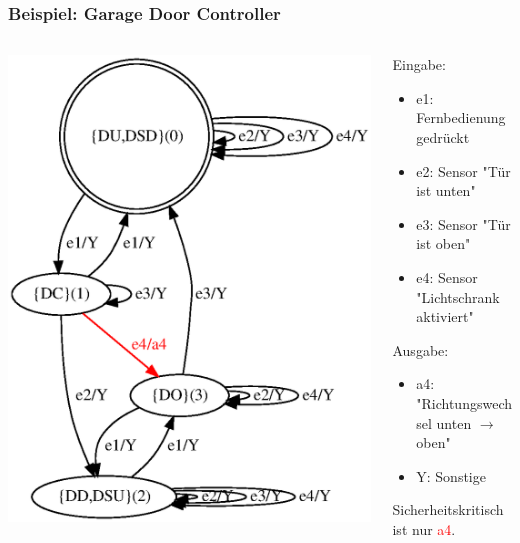     \begin{frame}
    \frametitle{Beispiel: Garage Door Controller}
    \begin{columns}[T] %
    \begin{column}{.53\textwidth}
    
    \includegraphics[width=\textwidth]{images/gdc_abs_min_colored}
    \end{column}%
    \hfill%
    \begin{column}{.55\textwidth}
    Eingabe:
    \begin{itemize}
      \item e1: Fernbedienung gedrückt
      \item e2: Sensor "Tür ist unten"
      \item e3: Sensor "Tür ist oben"
      \item e4: Sensor "Lichtschrank aktiviert"
    \end{itemize}
    Ausgabe:
    \begin{itemize}
      \item a4: "Richtungswechsel unten $\rightarrow$ oben"
      \item Y: Sonstige
    \end{itemize}
    Sicherheitskritisch ist nur \textcolor{red}{a4}.
    \end{column}%
    \end{columns}
    \end{frame}
